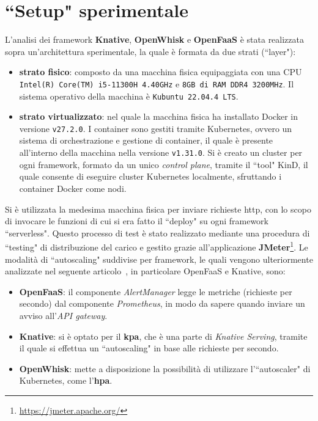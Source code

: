 \documentclass[12pt,a4paper,openany,twoside]{book}
\begin{document}

\chapter{``Setup" sperimentale}
\label{chap:setup-sperimentale}

L'analisi dei framework \textbf{Knative}, \textbf{OpenWhisk} e \textbf{OpenFaaS} è stata realizzata sopra un'architettura sperimentale, la quale è formata da due strati (``layer"):
\begin{itemize}
    \item \textbf{strato fisico}: composto da una macchina fisica equipaggiata con una CPU \texttt{Intel(R) Core(TM) i5-11300H 4.40GHz} e \texttt{8GB di RAM DDR4 3200MHz}. Il sistema operativo della macchina è \texttt{Kubuntu 22.04.4 LTS}.
    
    \item \textbf{strato virtualizzato}: nel quale la macchina fisica ha installato Docker in versione \texttt{v27.2.0}. I container sono gestiti tramite Kubernetes, ovvero un sistema di orchestrazione e gestione di container, il quale è presente all'interno della macchina nella versione \texttt{v1.31.0}. Si è creato un cluster per ogni framework, formato da un unico \textit{control plane}, tramite il ``tool" KinD, il quale consente di eseguire cluster Kubernetes localmente, sfruttando i container Docker come nodi.
\end{itemize}
Si è utilizzata la medesima macchina fisica per inviare richieste \ac{http}, con lo scopo di invocare le funzioni di cui si era fatto il ``deploy" su ogni framework ``serverless". Questo processo di test è stato realizzato mediante una procedura di ``testing" di distribuzione del carico e gestito grazie all'applicazione \textbf{JMeter}\footnote{\url{https://jmeter.apache.org/}}. Le modalità di ``autoscaling" suddivise per framework, le quali vengono ulteriormente analizzate nel seguente articolo~\cite{Li2021}, in particolare OpenFaaS e Knative, sono:
\begin{itemize}
    \item \textbf{OpenFaaS}: il componente \textit{AlertManager} legge le metriche (richieste per secondo) dal componente \textit{Prometheus}, in modo da sapere quando inviare un avviso all'\textit{API gateway}.
    
    \item \textbf{Knative}: si è optato per il \textbf{\ac{kpa}}, che è una parte di \textit{Knative Serving}, tramite il quale si effettua un ``autoscaling" in base alle richieste per secondo.
    
    \item \textbf{OpenWhisk}: mette a disposizione la possibilità di utilizzare l'``autoscaler" di Kubernetes, come l'\textbf{\ac{hpa}}.
\end{itemize}
\end{document}
